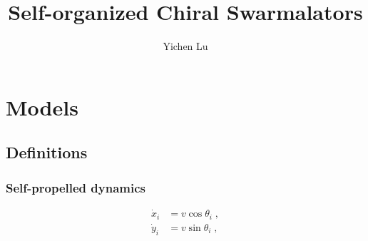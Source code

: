 \documentclass{article}
\title{\textbf{Self-organized Chiral Swarmalators}}
\author{Yichen Lu}
\begin{document}
\maketitle

\tableofcontents

\newpage
\section{Models}
\subsection{Definitions}
\subsubsection{Self-propelled dynamics}

\begin{subequations}
    \begin{align}
    \dot{x}_i&=v\cos \theta _i\;,
    \\
    \dot{y}_i&=v\sin \theta _i\;,
    \end{align}
    \label{eq:dotxy}
\end{subequations}
\end{document}
